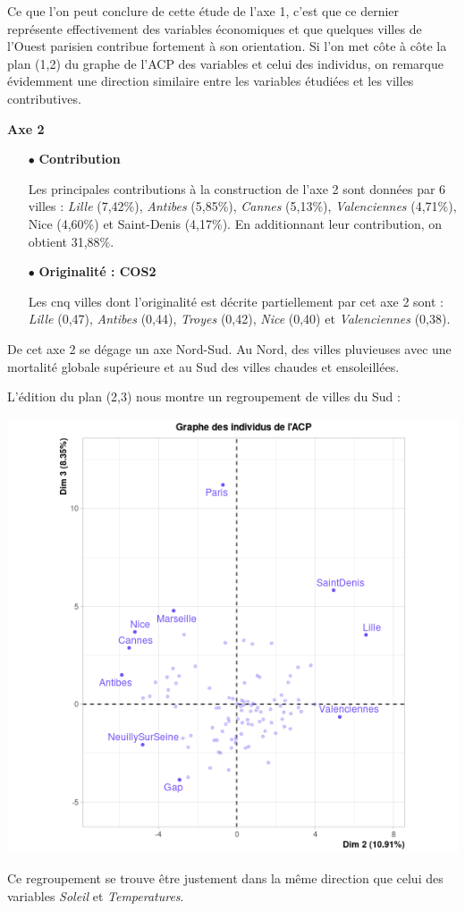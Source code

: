 \documentclass{article}
\begin{document}
Ce que l'on peut conclure de cette étude de l'axe 1, c'est que ce dernier représente effectivement des variables économiques et que quelques villes de l'Ouest parisien contribue fortement à son orientation. Si l'on met côte à côte la plan (1,2) du graphe de l'ACP des variables et celui des individus, on remarque évidemment une direction similaire entre les variables étudiées et les villes contributives.

\bigskip

{\large \textbf{Axe 2}}

\begin{itemize}
\item[$\bullet$] \textbf{Contribution}

Les principales contributions à la construction de l'axe 2 sont données par 6 villes : \emph{Lille} (7,42\%), \emph{Antibes} (5,85\%), \emph{Cannes} (5,13\%), \emph{Valenciennes} (4,71\%), Nice (4,60\%) et Saint-Denis (4,17\%). En additionnant leur contribution, on obtient 31,88\%. 

\item[$\bullet$] \textbf{Originalité : COS2}

Les cnq villes dont l'originalité est décrite partiellement par cet axe 2 sont : \emph{Lille} (0,47), \emph{Antibes} (0,44), \emph{Troyes} (0,42), \emph{Nice} (0,40) et \emph{Valenciennes} (0,38).
\end{itemize}

De cet axe 2 se dégage un axe Nord-Sud. Au Nord, des villes pluvieuses avec une mortalité globale supérieure et au Sud des villes chaudes et ensoleillées.

L'édition du plan (2,3) nous montre un regroupement de villes du Sud :

\centerline{\includegraphics[width=0.5\linewidth]{images/ACP_ind_23_contrib}} 

Ce regroupement se trouve être justement dans la même direction que celui des variables \emph{Soleil} et \emph{Temperatures}.
\end{document}
